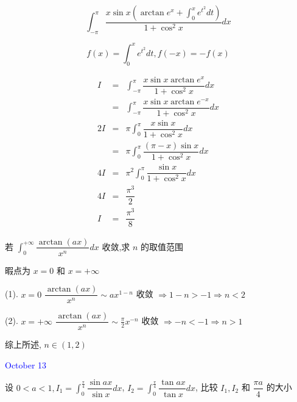 \begin{example}[][Exam: 36.2.9]
	$$\int_{-\pi}^{\pi}\dfrac{x\sin x\left( \arctan e^x+\int_{0}^{x}e^{t^2}dt\right) }{1+\cos^2 x}dx$$
\end{example}
\begin{solution}

	$$f(x) = \int_{0}^{x}e^{t^{2}}dt, f(-x) = -f(x)$$
	
	\begin{eqnarray*}
		I & = & \int_{-\pi}^{\pi}\dfrac{x\sin x\arctan e^x}{1+\cos^2 x}dx\\
		  & = & \int_{-\pi}^{\pi}\dfrac{x\sin x\arctan e^{-x}}{1+\cos^2 x}dx\\
	   2I & = & \pi\int_{0}^{\pi}\dfrac{x\sin x}{1+\cos^2 x}dx\\
		  & = & \pi\int_{0}^{\pi}\dfrac{(\pi-x)\sin x}{1+\cos^2 x}dx\\
	   4I & = & \pi^2\int_{0}^{\pi}\dfrac{\sin x}{1+\cos^2 x}dx\\
	   4I & = & \dfrac{\pi^3}{2}\\
		I & = & \dfrac{\pi^3}{8}
	\end{eqnarray*}
\end{solution}

\begin{example}[][Exam: 36.2.10]
	若 $\int_{0}^{+\infty}\dfrac{\arctan(ax)}{x^n}dx$ 收敛,求 $n$ 的取值范围
\end{example}

\begin{solution}

	暇点为 $x = 0$ 和 $x = +\infty$
	
	(1). $x=0$ $\dfrac{\arctan (ax)}{x^n}\sim ax^{1-n}$ 收敛 $\Rightarrow 1-n>-1\Rightarrow n<2$
	
	(2). $x=+\infty$ $\dfrac{\arctan (ax)}{x^n}\sim \frac{\pi}{2}x^{-n}$ 收敛 $\Rightarrow -n<-1\Rightarrow n>1$
	
	综上所述, $n\in(1,2)$
\end{solution}


\textcolor{blue}{October 13}

\begin{example}[][Exam: 36.2.11]
	设 $0<a<1,\displaystyle{I_{1}=\int_{0}^{\frac{\pi}{4}}\dfrac{\sin ax}{\sin x}dx}$,
$\displaystyle{I_{2}=\int_{0}^{\frac{\pi}{4}}\dfrac{\tan ax}{\tan x}dx}$,
比较 $I_{1},I_{2}$ 和 $\dfrac{\pi a}{4}$ 的大小
\end{example}

